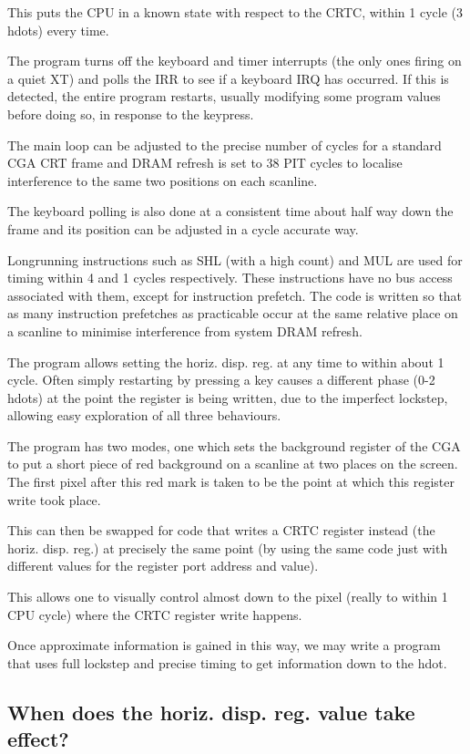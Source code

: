 \documentclass[a4paper,10pt]{amsart}
\begin{document}
This puts the CPU in a known state with respect to the CRTC, within 1 cycle (3
hdots) every time.

The program turns off the keyboard and timer interrupts (the only ones firing
on a quiet XT) and polls the IRR to see if a keyboard IRQ has occurred. If this
is detected, the entire program restarts, usually modifying some program values
before doing so, in response to the keypress.

The main loop can be adjusted to the precise number of cycles for a standard
CGA CRT frame and DRAM refresh is set to 38 PIT cycles to localise interference
to the same two positions on each scanline.

The keyboard polling is also done at a consistent time about half way down the
frame and its position can be adjusted in a cycle accurate way.

Longrunning instructions such as SHL (with a high count) and MUL are used for
timing within 4 and 1 cycles respectively. These instructions have no bus
access associated with them, except for instruction prefetch. The code is
written so that as many instruction prefetches as practicable occur at the same
relative place on a scanline to minimise interference from system DRAM refresh.

The program allows setting the horiz. disp. reg. at any time to within about 1
cycle. Often simply restarting by pressing a key causes a different phase (0-2
hdots) at the point the register is being written, due to the imperfect
lockstep, allowing easy exploration of all three behaviours.

The program has two modes, one which sets the background register of the CGA
to put a short piece of red background on a scanline at two places on the
screen. The first pixel after this red mark is taken to be the point at which
this register write took place.

This can then be swapped for code that writes a CRTC register instead (the
horiz. disp. reg.) at precisely the same point (by using the same code just
with different values for the register port address and value).

This allows one to visually control almost down to the pixel (really to
within 1 CPU cycle) where the CRTC register write happens.

Once approximate information is gained in this way, we may write a program that
uses full lockstep and precise timing to get information down to the hdot.

\subsection{When does the horiz. disp. reg. value take effect?}
\end{document}
